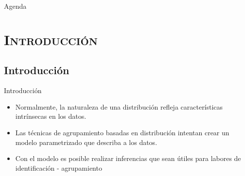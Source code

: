 \documentclass[xcolor=x11names,compress]{beamer}
\renewcommand{\(}{\begin{columns}}
\renewcommand{\)}{\end{columns}}
\newcommand{\<}[1]{\begin{column}{#1}}
\renewcommand{\>}{\end{column}}
\begin{document}

\begin{frame}{Agenda}
\tableofcontents
\end{frame}

\section{\scshape Introducción}
\subsection{Introducción}
\begin{frame}{Introducción}
\begin{itemize}
	\item Normalmente, la naturaleza de una distribución refleja características intrínsecas en los datos.
	\item Las técnicas de agrupamiento basadas en distribución intentan crear un modelo parametrizado que describa a los datos.
	\item Con el modelo es posible realizar inferencias que sean útiles para labores de identificación - agrupamiento
\end{itemize}
\end{frame}
\end{document}
